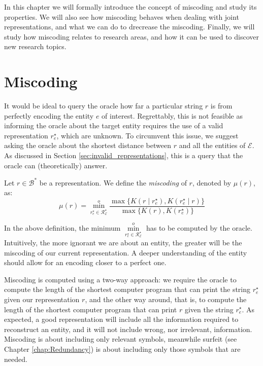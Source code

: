 In this chapter we will formally introduce the concept of miscoding and study its properties. We will also see how miscoding behaves when dealing with joint representations, and what we can do to drecrease the miscoding. Finally, we will study how miscoding relates to research areas, and how it can be used to discover new research topics.

%
%
\section{Miscoding}
\label{sec:miscoding}

It would be ideal to query the oracle how far a particular string $r$ is from perfectly encoding the entity $e$ of interest. Regrettably, this is not feasible as informing the oracle about the target entity requires the use of a valid representation $r^\star_e$, which are unknown. To circumvent this issue, we suggest asking the oracle about the shortest distance between $r$ and all the entities of $\mathcal{E}$.  As discussed in Section \ref{sec:invalid_representations}, this is a query that the oracle can (theoretically) answer.

\begin{definition} [Miscoding]
\label{def:miscoding}
Let $r \in \mathcal{B}^\ast$ be a representation. We define the \emph{miscoding} of $r$, denoted by $\mu(r)$, as:
\[
\mu(r) = \overset{o}{ \underset{ r^\star_e \in \mathcal{R}^\star_\mathcal{E} } \min} \frac{ \max\{ K \left( r \mid r^\star_e \right), K \left( r^\star_e \mid r \right) \} } { \max\{ K \left( r \right), K \left( r^\star_e \right) \} }
\]
\end{definition}

In the above definition, the minimum $\overset{o}{ \underset{ r^\star_e \in \mathcal{R}^\star_\mathcal{E} } \min}$ has to be computed by the oracle. Intuitively, the more ignorant we are about an entity, the greater will be the miscoding of our current representation. A deeper understanding of the entity should allow for an encoding closer to a perfect one.

Miscoding is computed using a two-way approach: we require the oracle to compute the length of the shortest computer program that can print the string $r^\star_e$ given our representation $r$, and the other way around, that is, to compute the length of the shortest computer program that can print $r$ given the string $r^\star_e$. As expected, a good representation will include all the information required to reconstruct an entity, and it will not include wrong, nor irrelevant, information. Miscoding is about including only relevant symbols, meanwhile surfeit (see Chapter \ref{chap:Redundancy}) is about including only those symbols that are needed.

